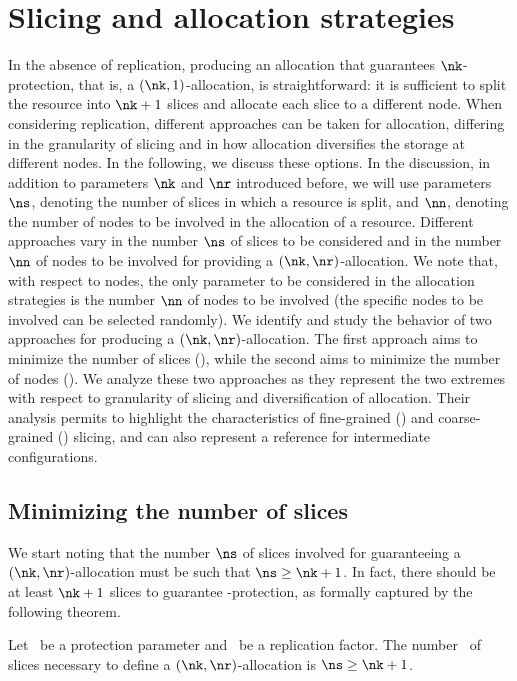 \section[Strategies]{Slicing and allocation strategies}\label{dcs:sec:functions}

In the absence of replication, producing an allocation that guarantees
$\nk$-protection, that is, a $(\nk,1)$-allocation, is straightforward:
it is sufficient to split the resource into $\nk+1$ slices and
allocate each slice to a different node.  When considering
replication, different approaches can be taken for allocation,
differing in the granularity of slicing and in how allocation
diversifies the storage at different nodes.  In the following, we
discuss these options. In the discussion, in addition to parameters
$\nk$ and $\nr$ introduced before, we will use parameters $\ns$,
denoting the number of slices in which a resource is split, and $\nn$,
denoting the number of nodes to be involved in the allocation of a
resource.  Different approaches vary in the number $\ns$ of slices to
be considered and in the number $\nn$ of nodes to be involved for
providing a $(\nk,\nr)$-allocation.  We note that, with respect to
nodes, the only parameter to be considered in the allocation
strategies is the number $\nn$ of nodes to be involved (the specific
nodes to be involved can be selected randomly).  We identify and study
the behavior of two approaches for producing a $(\nk,\nr)$-allocation.
The first approach aims to minimize the number of slices (\Diagonal),
while the second aims to minimize the number of nodes (\Compact). We
analyze these two approaches as they represent the two extremes with
respect to granularity of slicing and diversification of
allocation. Their analysis permits to highlight the characteristics of
fine-grained (\Compact) and coarse-grained (\Diagonal) slicing, and
can also represent a reference for intermediate configurations.


\subsection{Minimizing the number of slices}\label{dcs:ss:diagonal}
 

We start noting that the number $\ns$ of slices involved for
guaranteeing a $(\nk,\nr)$-allocation must be such that $\ns \geq \nk
+1$. In fact, there should be at least $\nk+1$ slices to guarantee
\nk-protection, as formally captured by the following theorem.


\smallskip
\begin{theorem}
Let \nk\ be a protection parameter and \nr\ be a replication
factor. The number \ns\ of slices necessary to define a
$(\nk,\nr)$-allocation is $\ns \geq \nk+1$.
\end{theorem}
\smallskip


